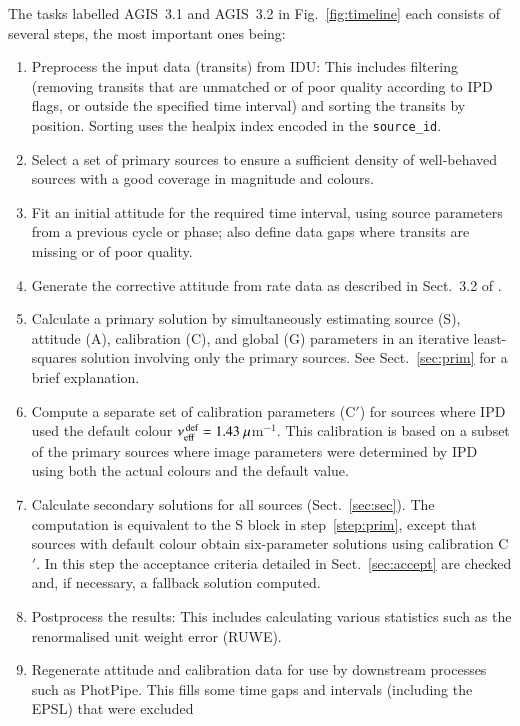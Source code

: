 \documentclass[longauth]{aa} %
\newcommand{\gacs}[1]{{\footnotesize\texttt{#1}}}
\begin{document}
The tasks labelled AGIS~3.1 and AGIS~3.2 in Fig.~\ref{fig:timeline} each consists of
several steps, the most important ones being:
\begin{enumerate} 
\item
Preprocess the input data (transits) from IDU: This includes filtering (removing transits
that are unmatched or of poor quality according to IPD flags, or outside the specified
time interval) and sorting the transits by position. Sorting uses the healpix index
 encoded in the \gacs{source\_id}.
\item
Select a set of primary sources to ensure a sufficient density of well-behaved sources with
a good coverage in magnitude and colours.
\item
Fit an initial attitude for the required time interval, using source parameters from a 
previous cycle or phase; also define data gaps where transits are missing or of poor quality.
\item
Generate the corrective attitude from rate data as described in Sect.~3.2 of 
.
\item\label{step:prim}
Calculate a primary solution by simultaneously estimating source (S), attitude (A),
calibration (C), and global (G) parameters in an iterative least-squares solution involving
only the primary sources. See Sect.~\ref{sec:prim} for a brief explanation.
\item\label{step:Cprime}
Compute a separate set of calibration parameters (C$'$) for sources where
IPD used the default colour $\nu_\text{eff}^\text{\,def}=1.43~\mu$m$^{-1}$. This
calibration is based on a subset of the primary sources where image parameters 
were determined by IPD using both the actual colours and the default value.
\item
Calculate secondary solutions for all sources (Sect.~\ref{sec:sec}). 
The computation is equivalent to the S block in step~\ref{step:prim},
except that sources with default colour obtain six-parameter solutions
using calibration C$'$. In this step the acceptance criteria detailed in Sect.~\ref{sec:accept}
are checked and, if necessary, a fallback solution computed. 
\item
Postprocess the results: This includes calculating various statistics such as the
renormalised unit weight error (RUWE).
\item\label{step:CoMaRa}
Regenerate attitude and calibration data for use by downstream processes such as 
PhotPipe. This fills some time gaps and intervals (including the EPSL) that were excluded 

\end{enumerate}
\end{document}
